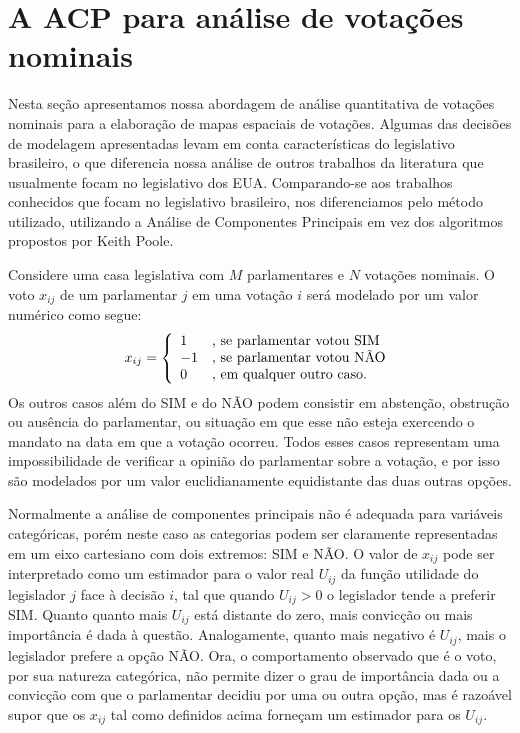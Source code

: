 \documentclass[a4paper, 12pt]{article}
\newcommand\nay{NÃO\xspace}
\newcommand\yea{SIM\xspace}
\begin{document}
\section{A ACP para análise de votações nominais}
\label{sec:acp}

Nesta seção apresentamos nossa abordagem de análise quantitativa de votações nominais para a elaboração de mapas espaciais de votações. Algumas das decisões de modelagem apresentadas levam em conta características do legislativo brasileiro, o que diferencia nossa análise de outros trabalhos da literatura que usualmente focam no legislativo dos EUA. Comparando-se aos trabalhos conhecidos que focam no legislativo brasileiro, nos diferenciamos pelo método utilizado, utilizando a Análise de Componentes Principais em vez dos algoritmos propostos por Keith Poole.

Considere uma casa legislativa com $M$ parlamentares e $N$ votações nominais. O voto $x_{ij}$ de um parlamentar $j$ em uma votação $i$ será modelado por um valor numérico como segue:
\[
   x_{ij} = \left\{ 
     \begin{array}{l l}
        1 & \text{, se parlamentar votou \yea} \\
       -1 & \text{, se parlamentar votou \nay} \\
        0 & \text{, em qualquer outro caso.} 
     \end{array} \right.
\]
Os outros casos além do \yea e do \nay podem consistir em abstenção, obstrução ou ausência do parlamentar, ou situação em que esse não esteja exercendo o mandato na data em que a votação ocorreu. Todos esses casos representam uma impossibilidade de verificar a opinião do parlamentar sobre a votação, e por isso são modelados por um valor euclidianamente equidistante das duas outras opções.

Normalmente a análise de componentes principais não é adequada para variáveis categóricas, porém neste caso as categorias podem ser claramente representadas em um eixo cartesiano com dois extremos: SIM e NÃO. O valor de $x_{ij}$ pode ser interpretado como um estimador para o valor real $U_{ij}$ da função utilidade do legislador $j$ face à decisão $i$, tal que quando $U_{ij} > 0$ o legislador tende a preferir \yea. Quanto  quanto mais $U_{ij}$ está distante do zero, mais convicção ou mais importância é dada à questão. Analogamente, quanto mais negativo é $U_{ij}$, mais o legislador prefere a opção \nay. Ora, o comportamento observado que é o voto, por sua natureza categórica, não permite dizer o grau de importância dada ou a convicção com que o parlamentar decidiu por uma ou outra opção, mas é razoável supor que os $x_{ij}$ tal como definidos acima forneçam um estimador para os $U_{ij}$.
\end{document}
